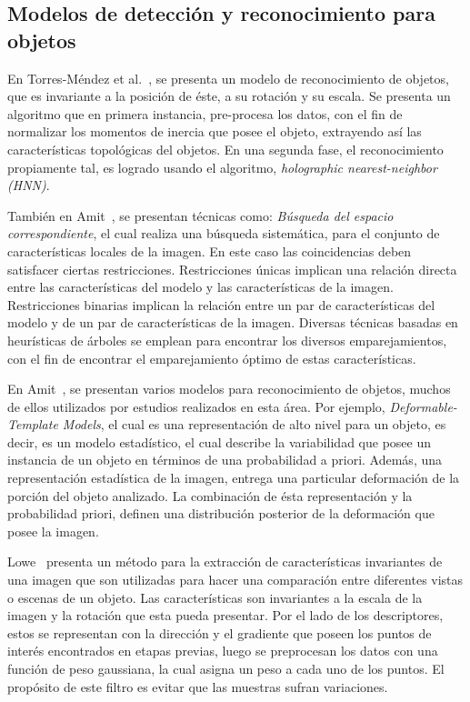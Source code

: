 \subsection{Modelos de detección y reconocimiento para objetos}
En Torres-Méndez et al.~\cite{trsi2000}, se presenta un modelo de reconocimiento de objetos, que es invariante a la posición de éste, a su rotación y su escala. Se presenta un algoritmo que en primera instancia, pre-procesa los datos, con el fin de normalizar los momentos de inercia que posee el objeto, extrayendo así las características topológicas del objetos. En una segunda fase, el reconocimiento propiamente tal, es logrado usando el algoritmo, \textit{holographic nearest-neighbor (HNN)}.

También en Amit~\cite{2dobject2002}, se presentan técnicas como: \textit{Búsqueda del espacio correspondiente}, el cual realiza una búsqueda sistemática, para el conjunto de características locales de la imagen. En este caso las coincidencias deben satisfacer ciertas restricciones. Restricciones únicas implican una relación directa entre las características del modelo y las características de la imagen. Restricciones binarias implican la relación entre un par de características del modelo y de un par de características de la imagen. Diversas técnicas basadas en heurísticas de árboles se emplean para encontrar los diversos emparejamientos, con el fin de encontrar el emparejamiento óptimo de estas características.

En Amit~\cite{2dobject2002}, se presentan varios modelos para reconocimiento de objetos, muchos de ellos utilizados por estudios realizados en esta área. Por ejemplo, \textit{Deformable-Template Models}, el cual es una representación de alto nivel para un objeto, es decir, es un modelo estadístico, el cual describe la variabilidad que posee un instancia de un objeto en términos de una probabilidad a priori. Además, una representación  estadística de la imagen, entrega una particular deformación de la porción del objeto analizado. La combinación de ésta representación y la probabilidad priori, definen una distribución posterior de la deformación que posee la imagen.

Lowe~\cite{sift2004} presenta un método para la extracción de características invariantes de una imagen que son utilizadas para hacer una comparación entre diferentes vistas o escenas de un objeto. Las características son invariantes a la escala de la imagen y la rotación que esta pueda presentar. Por el lado de los descriptores, estos se representan con la dirección y el gradiente que poseen los puntos de interés encontrados en etapas previas, luego se preprocesan los datos con una función de peso gaussiana, la cual asigna un peso a cada uno de los puntos. El propósito de este filtro es evitar que las muestras sufran variaciones.

